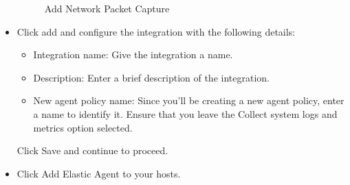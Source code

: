 \documentclass{report}
\begin{document}
\begin{itemize}
\begin{figure}
		\caption{Add Network Packet Capture}
		\label{fig:Select Integration}
	\end{figure}
	\item Click add and configure the integration with the following details:
	\begin{itemize}
		\item Integration name: Give the integration a name.
		\item Description: Enter a brief description of the integration.
		\item New agent policy name: Since you'll be creating a new agent policy, enter a name to identify it. 
		Ensure that you leave the Collect system logs and metrics option selected.
	\end{itemize}
	Click Save and continue to proceed.
	\item Click Add Elastic Agent to your hosts.
\end{itemize}
\end{document}
